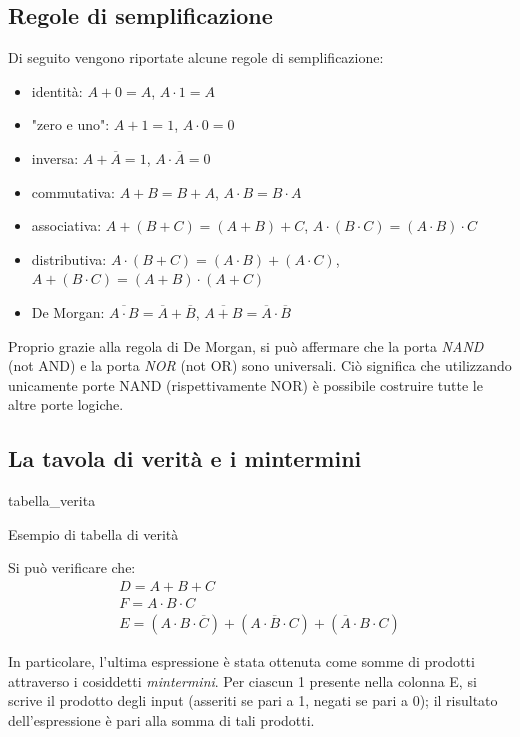 \documentclass[class=book, crop=false, oneside]{standalone}
\begin{document}
\subsection{Regole di semplificazione}
\label{subsec:semplificazione}
Di seguito vengono riportate alcune regole di semplificazione:
\begin{itemize}
	\item identità: \(A+0=A\), \(A\cdot 1=A\)
	\item "zero e uno": \(A+1=1\), \(A\cdot 0=0\)
	\item inversa: \(A+\overline{A}=1\), \(A\cdot\overline{A}=0\)
	\item commutativa: \(A+B=B+A\), \(A\cdot B=B\cdot A\)
	\item associativa: \(A+(B+C)=(A+B)+C\), \(A\cdot(B\cdot C)=(A\cdot B)\cdot C\)
	\item distributiva: \(A\cdot(B+C)=(A\cdot B)+(A\cdot C)\), \(A+(B\cdot C)=(A+B)\cdot(A+C)\)
	\item De Morgan: \(\overline{A\cdot B} = \overline{A}+\overline{B}\), \(\overline{A+B} = \overline{A}\cdot\overline{B}\)
\end{itemize}
Proprio grazie alla regola di De Morgan, si può affermare che la porta \emph{NAND} (not AND) e la porta \emph{NOR} (not OR) sono universali. Ciò significa che utilizzando unicamente porte NAND (rispettivamente NOR) è possibile costruire tutte le altre porte logiche.

\subsection{La tavola di verità e i mintermini}
\label{subsec:mintermini}
\begin{table}[H]
	\centering
	{tabella_verita}
	\caption{Esempio di tabella di verità}
	\label{tabella-verita}
\end{table}
Si può verificare che:
\begin{gather*}
D = A+B+C\\
F = A\cdot B\cdot C\\
E = (A\cdot B\cdot\overline{C}) + (A\cdot \overline{B} \cdot C) + (\overline{A} \cdot B\cdot C)
\end{gather*}

In particolare, l'ultima espressione è stata ottenuta come somme di prodotti attraverso i cosiddetti \emph{mintermini}. Per ciascun 1 presente nella colonna E, si scrive il prodotto degli input (asseriti se pari a 1, negati se pari a 0); il risultato dell'espressione è pari alla somma di tali prodotti.
\end{document}
